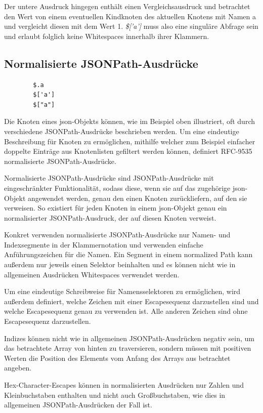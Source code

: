 \documentclass[oneside]{ausarbeitung}
\begin{document}
	Der untere Ausdruck hingegen enthält einen Vergleichsausdruck und betrachtet den Wert von einem eventuellen Kindknoten des aktuellen Knotens mit Namen a und vergleicht diesen mit dem Wert 1. \textit{\$['a']} muss also eine singuläre Abfrage sein und erlaubt folglich keine Whitespaces innerhalb ihrer Klammern.
	
	
	
	
	\subsection{Normalisierte JSONPath-Ausdrücke}
	
	\begin{lstlisting}
		$.a
		$['a']
		$["a"]
	\end{lstlisting}
	
	Die Knoten eines \ac{json}-Objekts können, wie im Beispiel oben illustriert, oft durch verschiedene JSONPath-Ausdrücke beschrieben werden. Um eine eindeutige Beschreibung für Knoten zu ermöglichen, mithilfe welcher zum Beispiel einfacher doppelte Einträge aus Knotenlisten gefiltert werden können, definiert RFC-9535 normalisierte JSONPath-Ausdrücke.
	
	Normalisierte JSONPath-Ausdrücke sind JSONPath-Ausdrücke mit eingeschränkter Funktionalität, sodass diese, wenn sie auf das zugehörige \ac{json}-Objekt angewendet werden, genau den einen Knoten zurückliefern, auf den sie verweisen. So existiert für jeden Knoten in einem \ac{json}-Objekt genau ein normalisierter JSONPath-Ausdruck, der auf diesen Knoten verweist. 
	
	Konkret verwenden normalisierte JSONPath-Ausdrücke nur Namen- und Indexsegmente in der Klammernotation und verwenden einfache Anführungszeichen für die Namen. Ein Segment in einem normalized Path kann außerdem nur jeweils einen Selektor beinhalten und es können nicht wie in allgemeinen Ausdrücken Whitespaces verwendet werden. 
	
	Um eine eindeutige Schreibweise für Namensselektoren zu ermöglichen, wird außerdem definiert, welche Zeichen mit einer Escapesequenz darzustellen sind und welche Escapesequenz genau zu verwenden ist. Alle anderen Zeichen sind ohne Escapesequenz darzustellen.
	
	Indizes können nicht wie in allgemeinen JSONPath-Ausdrücken negativ sein, um das betrachtete Array von hinten zu traversieren, sondern müssen mit positiven Werten die Position des Elements vom Anfang des Arrays aus betrachtet angeben.
	
	Hex-Character-Escapes können in normalisierten Ausdrücken nur Zahlen und Kleinbuchstaben enthalten und nicht auch Großbuchstaben, wie dies in allgemeinen JSONPath-Ausdrücken der Fall ist.
	
\end{document}
